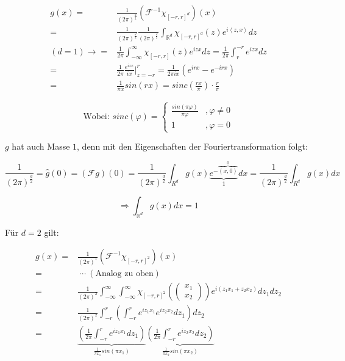 \documentclass{article}
\theoremstyle{plain}
\theoremstyle{definition}
\numberwithin{equation}{section}
\newcommand{\skprod}[2]{
\left \langle #1,#2 \right \rangle
}
\newcommand{\R}[0] {
\mathbb R
}
\newcommand{\srmatrix}[1] {
\left( \begin{smallmatrix} #1 \end{smallmatrix} \right)
}
\newcommand{\x}[0] {
  \boldsymbol{x}
}
\begin{document}
    \normalsize
    \begin{align*}
        g(x) = & \frac{1}{( 2 \pi)^{\frac{d}{2}}}(\mathcal F^{-1} \chi_{[-r,r]^d})(x)\\
        = & \frac{1}{( 2 \pi)^{\frac{d}{2}}} \frac{1}{( 2 \pi)^{\frac{d}{2}}} \int_{\R^d} \chi_{[-r,r]^d}(z) e^{i \skprod{z}{x}} dz\\
        (d=1) \to = & \frac{1}{2 \pi} \int_{-\infty}^{\infty} \chi_{[-r,r]}(z) e^{izx} dz = \frac{1}{2 \pi} \int_{r}^{-r} e^{izx} dz\\
        = & \frac{1}{2 \pi}  \frac{e^{izx}}{ix} \Big|_{z=-r}^{r} = \frac{1}{2 \pi i x}\left( e^{irx} - e^{-irx} \right)\\
        = & \frac{1}{\pi x} sin(rx) = sinc\left(\frac{rx}{\pi}\right) \cdot \frac{r}{\pi}
    \end{align*}

    \[\text{Wobei:\ } sinc(\varphi)=
    \begin{cases}
        \frac{sin(\pi \varphi)}{\pi \varphi} &, \varphi \neq 0\\
        1 &, \varphi = 0
    \end{cases}\]

    $g$ hat auch Masse $1$, denn mit den Eigenschaften der Fouriertransformation folgt:

    \[\frac{1}{( 2 \pi)^{\frac{d}{2}}} = \hat g(0) = (\mathcal F g)(0) = \frac{1}{( 2 \pi)^{\frac{d}{2}}} \int_{R^d} g(x) \underbrace{e^{-\overbrace{\skprod{x}{0}}^0}}_1 dx = \frac{1}{( 2 \pi)^{\frac{d}{2}}} \int_{R^d} g(x) dx\]

    \[\Rightarrow \int_{\R^d} g(x) dx = 1\]

    Für $d=2$ gilt:

    \begin{align*}
        g(x) = & \frac{1}{(2 \pi)^{1}}(\mathcal F^{-1} \chi_{[-r,r]^2})(x)\\
        = & \ \cdots \ (\text{Analog zu oben})\\
        = & \frac{1}{(2 \pi)^{2}} \int_{-\infty}^\infty  \int_{-\infty}^\infty \chi_{[-r,r]^2}\left( \srmatrix{x_1\\x_2} \right) e^{i (z_1 x_1 + z_2 x_2)} dz_1 dz_2\\
        = & \frac{1}{(2 \pi)^{2}} \int_{-r}^r \left( \int_{-r}^r e^{i z_1 x_1} e^{iz_2 x_2} dz_1 \right)dz_2\\
        = & \underbrace{ \left(\frac{1}{2 \pi} \int_{-r}^r e^{i z_1 x_1} dz_1\right) }_{\frac{1}{\pi x_1} sin(\pi x_1)} \underbrace{ \left( \frac{1}{2 \pi} \int_{-r}^r e^{iz_2 x_2} dz_2 \right)}_{\frac{1}{\pi x_2} sin(\pi x_2)}\\
    \end{align*}
\end{document}
